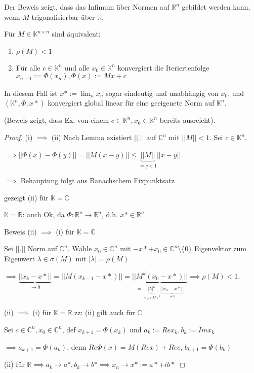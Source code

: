 \begin{remark}
	Der Beweis zeigt, dass das Infimum über Normen auf $\mathbb{R}^n$ gebildet werden kann, wenn $M$ trigonalisierbar über $\mathbb{R}$.
\end{remark}

\begin{theorem}
	Für $M \in \mathbb{K}^{n \times n}$ sind äquivalent:
	\begin{enumerate}
		\item $\rho(M) < 1$
		\item Für alle $c \in \mathbb{K}^n$ und alle $x_0 \in \mathbb{K}^n$ konvergiert die Iteriertenfolge $x_{n+1} := \Phi(x_n), \Phi(x) := Mx + c$
	\end{enumerate}
	In diesem Fall ist $x* := \lim_n x_n$ sogar eindeutig und unabhängig von $x_0$, und $(\mathbb{K}^n, \Phi, x*)$ konvergiert global linear für eine geeigenete Norm auf $\mathbb{K}^n$.
	
	(Beweis zeigt, dass Ex. von einem $c \in \mathbb{K}^n, x_0 \in \mathbb{K}^n$ bereits ausreicht).
\end{theorem}

\begin{proof}
	(i) $\implies$ (ii) Nach Lemma existiert $||.||$ auf $\mathbb{C}^n$ mit $||M|| < 1$. Sei $c \in \mathbb{K}^n$.
	
	$\implies ||\Phi(x) - \Phi(y)|| = ||M(x-y)|| \leq \underbrace{||M||}_{=q < 1} ||x-y||$.
	
	$\implies$ Behauptung folgt aus Banachschem Fixpunktsatz
	
	gezeigt (ii) für $\mathbb{K} = \mathbb{C}$
	
	$\mathbb{K} = \mathbb{R}$: auch Ok, da $\Phi: \mathbb{R}^n \rightarrow \mathbb{R}^n$, d.h. $x* \in \mathbb{R}^n$
	
	Beweis (ii) $\implies$ (i) für $\mathbb{K} = \mathbb{C}$
	
	Sei $||.||$ Norm auf $\mathbb{C}^n$. Wähle $x_0 \in \mathbb{C}^n$ mit $-x* + x_0 \in \mathbb{C}^n \setminus \{0\}$ Eigenvektor zum Eigenwert $\lambda \in \sigma(M)$ mit $|\lambda| = \rho(M)$
	
	$\implies \underbrace{||x_k - x*||}_{\rightarrow 0} = ||M(x_{k-1} - x*)|| = \underbrace{||M^k(x_0 - x*)||}_{=\underbrace{|\lambda|^k}_{=\rho(M)^k} \underbrace{||x_0 - x*||}_{\neq 0}} \implies \rho(M) < 1$.
	
	(ii) $\implies$ (i) für $\mathbb{K} = \mathbb{R}$ zz: (ii) gilt auch für $\mathbb{C}$
	
	Sei $c \in \mathbb{C}^n, x_0 \in \mathbb{C}^n$, def $x_{k+1} = \Phi(x_k)$ und $a_k := Re x_k, b_k := Im x_k$
	
	$\implies a_{k+1} = \Phi(a_k)$, denn $Re \Phi(x) = M(Re x) + Re c$, $b_{k+1} = \Phi(b_k)$
	
	(ii) für $\mathbb{R} \implies a_k \rightarrow a*, b_k \rightarrow b* \implies x_n \rightarrow x* := a* + i b*$
\end{proof}

